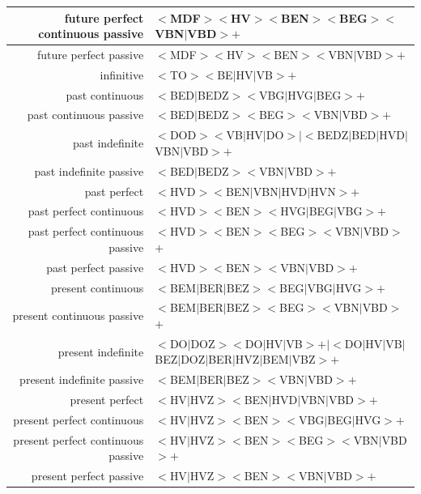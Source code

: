 \documentclass[10pt]{article}
\begin{document}
\begin{table}
\begin{tabular}{r|l}
      \midrule
      future perfect continuous passive & $<$MDF$>$$<$HV$>$$<$BEN$>$$<$BEG$>$$<$VBN$|$VBD$>$$+$ \\
      \midrule
      future perfect passive & $<$MDF$>$$<$HV$>$$<$BEN$>$$<$VBN$|$VBD$>$$+$ \\
      \midrule
      infinitive & $<$TO$>$$<$BE$|$HV$|$VB$>$$+$ \\
      \midrule
      past continuous & $<$BED$|$BEDZ$>$$<$VBG$|$HVG$|$BEG$>$$+$ \\
      \midrule
      past continuous passive & $<$BED$|$BEDZ$>$$<$BEG$>$$<$VBN$|$VBD$>$$+$ \\
      \midrule
      past indefinite & $<$DOD$>$$<$VB$|$HV$|$DO$>$$|$$<$BEDZ$|$BED$|$HVD$|$VBN$|$VBD$>$$+$ \\
      \midrule
      past indefinite passive & $<$BED$|$BEDZ$>$$<$VBN$|$VBD$>$$+$ \\
      \midrule
      past perfect & $<$HVD$>$$<$BEN$|$VBN$|$HVD$|$HVN$>$$+$ \\
      \midrule
      past perfect continuous & $<$HVD$>$$<$BEN$>$$<$HVG$|$BEG$|$VBG$>$$+$ \\
      \midrule
      past perfect continuous passive & $<$HVD$>$$<$BEN$>$$<$BEG$>$$<$VBN$|$VBD$>$$+$ \\
      \midrule
      past perfect passive & $<$HVD$>$$<$BEN$>$$<$VBN$|$VBD$>$$+$ \\
      \midrule
      present continuous & $<$BEM$|$BER$|$BEZ$>$$<$BEG$|$VBG$|$HVG$>$$+$ \\
      \midrule
      present continuous passive & $<$BEM$|$BER$|$BEZ$>$$<$BEG$>$$<$VBN$|$VBD$>$$+$ \\
      \midrule
      present indefinite & $<$DO$|$DOZ$>$$<$DO$|$HV$|$VB$>$$+$$|$$<$DO$|$HV$|$VB$|$BEZ$|$DOZ$|$BER$|$HVZ$|$BEM$|$VBZ$>$$+$ \\
      \midrule
      present indefinite passive & $<$BEM$|$BER$|$BEZ$>$$<$VBN$|$VBD$>$$+$ \\
      \midrule
      present perfect & $<$HV$|$HVZ$>$$<$BEN$|$HVD$|$VBN$|$VBD$>$$+$ \\
      \midrule
      present perfect continuous & $<$HV$|$HVZ$>$$<$BEN$>$$<$VBG$|$BEG$|$HVG$>$$+$ \\
      \midrule
      present perfect continuous passive & $<$HV$|$HVZ$>$$<$BEN$>$$<$BEG$>$$<$VBN$|$VBD$>$$+$ \\
      \midrule
      present perfect passive & $<$HV$|$HVZ$>$$<$BEN$>$$<$VBN$|$VBD$>$$+$ \\
      \bottomrule
    \end{tabular}
    \label{tab:regexp_templates}
\end{table}
\end{document}
